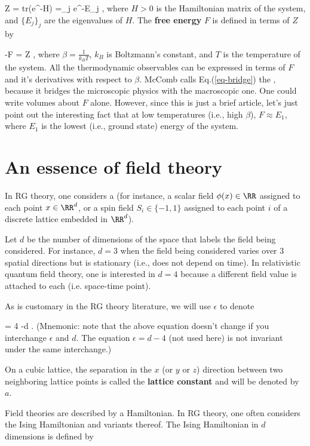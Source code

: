 \beq
Z = {\rm tr}(e^{-\beta H})
=\sum_j e^{-\beta E_j}
\;,
\eeq
where $H>0$ is the Hamiltonian matrix
of the system, and $\{E_j\}_j$ are the
eigenvalues of $H$.
The \textbf{free energy}
$F$ is defined in terms
of $Z$ by

\beq
-\beta F = \ln Z
\;,
\label{eq-bridge}
\eeq
 where
$\beta = \frac{1}{k_B T}$,
$k_B$ is Boltzmann's constant, and
$T$ is the temperature of the system.
All the thermodynamic observables
can be expressed in terms of
$F$ and it's derivatives with
respect to $\beta$.
McComb calls Eq.(\ref{eq-bridge})
the ,
because it bridges the microscopic physics
with the macroscopic one. 
One could write volumes about $F$
alone. However, since
this is just a brief article,
let's just point out the interesting fact that
at low temperatures (i.e., high $\beta$),
$F \approx E_1$, where $E_1$ is the
lowest (i.e., ground state)
energy of the system.


\section{An essence of field theory}
In RG theory, one considers
a  (for instance,
a scalar field $\phi(x)\in \RR$
assigned to each point $x\in \RR^d$,
or a spin field $S_i\in\{-1,1\}$
assigned to each point $i$ of a
discrete lattice
embedded in $\RR^d$).


Let $d$ be the number of dimensions of
the space that labels
the field being considered. For
instance, $d=3$
when the field being considered varies over
3 spatial directions but
is stationary (i.e., does not depend on time).
In relativistic quantum field theory,
one is interested in
$d=4$ because a different field
value is attached to each 
(i.e. space-time point).

As is customary in the RG theory literature,
we will use $\epsilon$ to denote

\beq
\epsilon = 4 -d
\;.
\eeq
(Mnemonic: note that the above
equation doesn't change if
you interchange $\epsilon$ and $d$.
The equation $\epsilon = d-4$ (not used here) is
not invariant under the same interchange.)


On a cubic lattice, the separation
in
the $x$ (or $y$ or $z$) direction
between two neighboring lattice points
is called the \textbf{lattice constant}
and will be denoted by $a$.

Field theories are described by
a Hamiltonian. In RG theory, one often
considers the
 Ising Hamiltonian
 and variants thereof.
 The Ising Hamiltonian in $d$ dimensions
 is defined by

